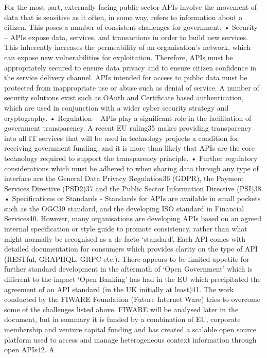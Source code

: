 For the most part, externally facing public sector APIs involve the movement of data that is sensitive as it
often, in some way, refers to information about a citizen. This poses a number of consistent challenges for
government:
• Security – APIs expose data, services, and transactions in order to build new services. This
inherently increases the permeability of an organisation’s network, which can expose new
vulnerabilities for exploitation. Therefore, APIs must be appropriately secured to ensure data
privacy and to ensure citizen confidence in the service delivery channel. APIs intended for access
to public data must be protected from inappropriate use or abuse such as denial of service. A
number of security solutions exist such as OAuth and Certificate based authentication, which are
used in conjunction with a wider cyber security strategy and cryptography.
• Regulation – APIs play a significant role in the facilitation of government transparency. A recent EU
ruling35 makes providing transparency into all IT services that will be used in technology projects a
condition for receiving government funding, and it is more than likely that APIs are the core
technology required to support the transparency principle. 
• Further regulatory considerations which must be adhered to when sharing data through any type of
interface are the General Data Privacy Regulation36 (GDPR), the Payment Services Directive
(PSD2)37 and the Public Sector Information Directive (PSI)38.
• Specifications or Standards - Standards for APIs are available in small pockets such as the OGC39
standard, and the developing ISO standard in Financial Services40. However, many organisations
are developing APIs based on an agreed internal specification or style guide to promote
consistency, rather than what might normally be recognised as a de facto ‘standard’. Each API
comes with detailed documentation for consumers which provides clarity on the type of API
(RESTful, GRAPHQL, GRPC etc.). There appears to be limited appetite for further standard
development in the aftermath of ‘Open Government’ which is different to the impact ‘Open Banking’
has had in the EU which precipitated the agreement of an API standard (in the UK initially at
least)41.
The work conducted by the FIWARE Foundation (Future Internet Ware) tries to overcome some of the
challenges listed above. FIWARE will be analysed later in the document, but in summary it is funded by a
combination of EU, corporate membership and venture capital funding and has created a scalable open
source platform used to access and manage heterogeneous context information through open APIs42. A
